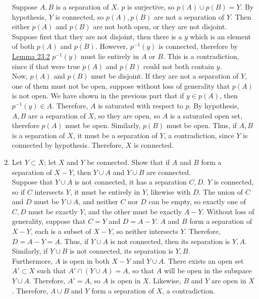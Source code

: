 \documentclass[12pt,letterpaper]{article}
\begin{document}
\begin{enumerate}
  Suppose $A,B$ is a separation of $X$. $p$ is surjective, so $p(A)\cup p(B) = Y$. By hypothesis, $Y$ is connected, so $p(A),p(B)$ are not a separation of $Y$. Then either $p(A)$ and $p(B)$ are not both open, or they are not disjoint. Suppose first that they are not disjoint, then there is a $y$ which is an element of both $p(A)$ and $p(B)$. However, $p^{-1}(y)$ is connected, therefore by \hyperref[thm:subspaceOfConnected]{Lemma 23.2} $p^{-1}(y)$ must lie entirely in $A$ or $B$. This is a contradiction, since if that were true $p(A)$ and $p(B)$ could not both contain $y$.\\
  Now, $p(A)$ and $p(B)$ must be disjoint. If they are not a separation of $Y$, one of them must not be open, suppose without loss of generality that $p(A)$ is not open. We have shown in the previous part that if $y\in p(A)$, then $p^{-1}(y)\in A$. Therefore, $A$ is saturated with respect to $p$. By hypothesis, $A,B$ are a separation of $X$, so they are open, so $A$ is a saturated open set, therefore $p(A)$ must be open. Similarly, $p(B)$ must be open. Thus, if $A,B$ is a separation of $X$, it must be a separation of $Y$, a contradiction, since $Y$ is connected by hypothesis. Therefore, $X$ is connected.
  \item Let $Y\subset X$; let $X$ and $Y$ be connected. Show that if $A$ and $B$ form a separation of $X-Y$, then $Y\cup A$ and $Y\cup B$ are connected.\\
  Suppose that $Y\cup A$ is not connected, it has a separation $C,D$. $Y$ is connected, so if $C$ intersects $Y$, it must be entirely in $Y$, likewise with $D$. The union of $C$ and $D$ must be $Y\cup A$, and neither $C$ nor $D$ can be empty, so exactly one of $C,D$ must be exactly $Y$, and the other must be exactly $A-Y$. Without loss of generality, suppose that $C=Y$ and $D=A-Y$. $A$ and $B$ form a separation of $X-Y$, each is a subset of $X-Y$, so neither intersects $Y$. Therefore, $D=A-Y=A$. Thus, if $Y\cup A$ is not connected, then its separation is $Y,A$. Similarly, if $Y\cup B$ is not connected, its separation is $Y,B$. \\
  Furthermore, $A$ is open in both $X-Y$ and $Y\cup A$. There exists an open set $A'\subset X$ such that $A' \cap (Y\cup A) = A$, so that $A$ will be open in the subspace $Y\cup A$. Therefore, $A'=A$, so $A$ is open in $X$. Likewise, $B$ and $Y$ are open in $X$. Therefore, $A\cup B$ and $Y$ form a separation of $X$, a contradiction.
\end{enumerate}
\end{document}
